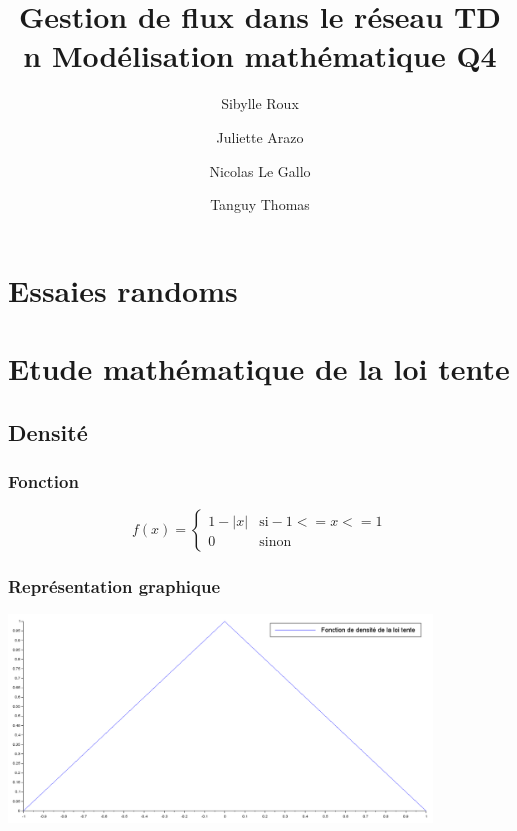 \documentclass{article}
\begin{document}
\title{Gestion de flux dans le réseau
	\smallbreak
	TD n
	\smallbreak
	Modélisation mathématique
	\smallbreak
	Q4}
\author{Sibylle Roux \and Juliette Arazo \and Nicolas Le Gallo \and Tanguy Thomas}

\maketitle

\newpage

\tableofcontents

\newpage

\section{Essaies randoms}

\subsection{}

\section{Etude mathématique de la loi tente}

\subsection{Densité}

\subsubsection{Fonction}

$$
f(x)=\left\{
	\begin{array}{ll}
		1-|x| & \mbox{si} -1<=x<=1\\
		0 & \mbox{sinon}
	\end{array}
\right.
$$

\subsubsection{Représentation graphique}
\begin{center}
\includegraphics[width=425px]{img/tente.png}
\end{center}
\end{document}
